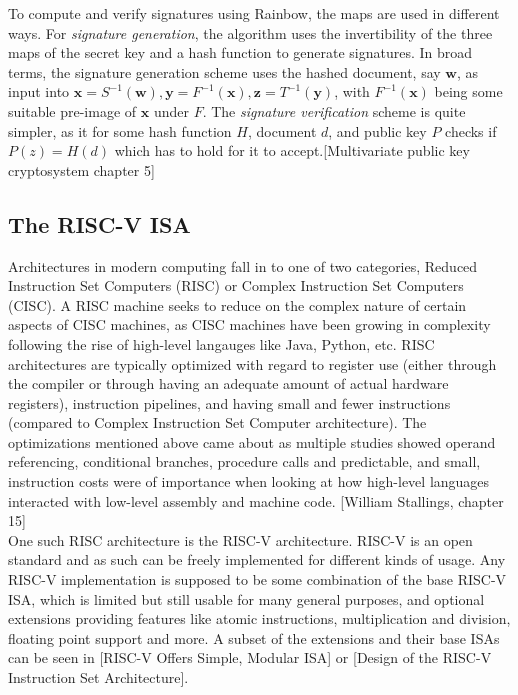 To compute and verify signatures using Rainbow, the maps are used in different ways.
For \textit{signature generation}, the algorithm uses the invertibility of the three maps of the secret key and a hash function to generate signatures. In broad terms, the signature generation scheme uses the hashed document, say $\mathbf{w}$, as input into $\mathbf{x} = S^{-1}(\mathbf{w}), \mathbf{y} = F^{-1}(\mathbf{x}), \mathbf{z} = T^{-1}(\mathbf{y})$, with $F^{-1}(\mathbf{x})$ being some suitable pre-image of $\mathbf{x}$ under $F$. The \textit{signature verification} scheme is quite simpler, as it for some hash function $H$, document $d$, and public key $P$ checks if $P(z) = H(d)$ which has to hold for it to accept.[Multivariate public key cryptosystem chapter 5]

\subsection{The RISC-V ISA} \label{pre-riscv}
Architectures in modern computing fall in to one of two categories, Reduced Instruction Set Computers (RISC) or Complex Instruction Set Computers (CISC). A RISC machine seeks to reduce on the complex nature of certain aspects of CISC machines, as CISC machines have been growing in complexity following the rise of high-level langauges like Java, Python, etc. RISC architectures are typically optimized with regard to register use (either through the compiler or through having an adequate amount of actual hardware registers), instruction pipelines, and having small and fewer instructions (compared to Complex Instruction Set Computer architecture). The optimizations mentioned above came about as multiple studies showed operand referencing, conditional branches, procedure calls and predictable, and small, instruction costs were of importance when looking at how high-level languages interacted with low-level assembly and machine code. [William Stallings, chapter 15] \medskip\\
One such RISC architecture is the RISC-V architecture. RISC-V is an open standard and as such can be freely implemented for different kinds of usage. Any RISC-V implementation is supposed to be some combination of the base RISC-V ISA, which is limited but still usable for many general purposes, and optional extensions providing features like atomic instructions, multiplication and division, floating point support and more. A subset of the extensions and their base ISAs can be seen in [RISC-V Offers Simple, Modular ISA] or [Design of the RISC-V Instruction Set Architecture].
